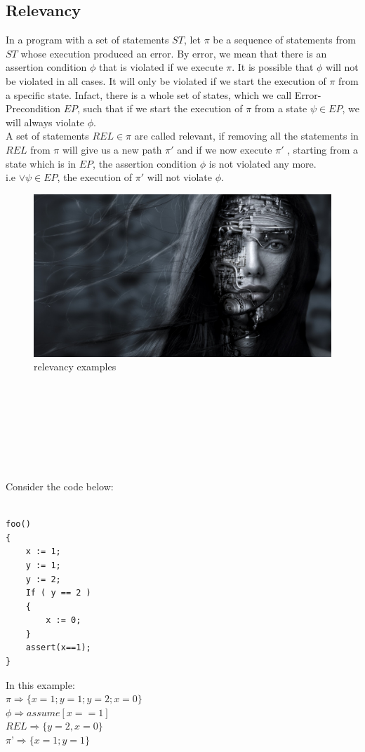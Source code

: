 \documentclass{article}
\begin{document}
\subsection{Relevancy}
In a program with a set of statements $ST$, let $\pi$ be a sequence of statements from $ST$ whose execution produced an error. By error, we mean that there is an assertion condition $\phi$ that is violated if we execute $\pi$. It is possible that $\phi$ will not be violated in all cases. It will only be violated if we start the execution of $\pi$ from a specific state. Infact, there is a whole set of states, which we call Error-Precondition $EP$, such that if we start the execution of $\pi$ from a state $\psi \in  EP$, we will always violate $\phi$.\\
A set of statements $REL \in \pi$ are called relevant, if removing all the statements in $REL$ from $\pi$ will give us a new path $\pi'$ and if we now execute $\pi'$ , starting from a state which is in $EP$, the assertion condition $\phi$ is not violated any more.
\\
i.e $ \vee  \psi \in EP$, the execution of  $\pi'$  will not violate $\phi$.
\begin{figure}[h!]
  \includegraphics[width=\linewidth]{test.jpg}
  \caption{relevancy examples}
  \label{fig:boat1}
\end{figure}
\\
\\
\\
\\
\\
\\
\\
Consider the code below:
\begin{lstlisting}

foo()
{
	x := 1;
	y := 1;
	y := 2;
	If ( y == 2 )
	{
		x := 0;
	}
	assert(x==1);
}

\end{lstlisting}
In this example: \\
$\pi \Rightarrow \{ x=1; y=1; y=2; x=0 \} $\\
$\phi \Rightarrow assume[x==1]$\\
$REL \Rightarrow \{y=2, x=0 \}$ \\
$\pi’ \Rightarrow \{x=1; y=1\}$
\end{document}
